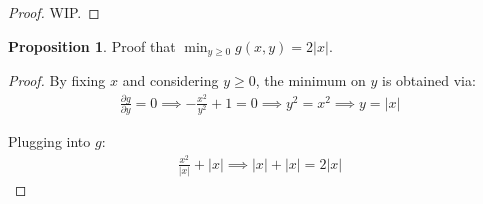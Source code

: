 \documentclass[12pt]{article}
\newcommand{\mo}[1]{\lvert #1 \rvert}
\theoremstyle{definition}
\newtheorem{prop}{Proposition}[section]
\begin{document}
	\begin{proof}
		WIP.
	\end{proof}
	
	\begin{prop}
		Proof that $\min_{y \geq 0} g(x, y) = 2 \mo{x}$.
	\end{prop}
	
	\begin{proof}
		By fixing $x$ and considering $y \geq 0$, the minimum on $y$ is obtained via:
		\begin{gather*}
			\frac{\partial g}{\partial y} = 0 \implies -\frac{x^2}{y^2} + 1 = 0 \implies  y^2 = x^2 \implies y = \mo{x}
		\end{gather*}
		
		Plugging into $g$:
		\begin{gather*}
			\frac{x^2}{\mo{x}} + \mo{x} \implies \mo{x} + \mo{x} = 2\mo{x}
		\end{gather*}
	\end{proof}
	
\end{document}
